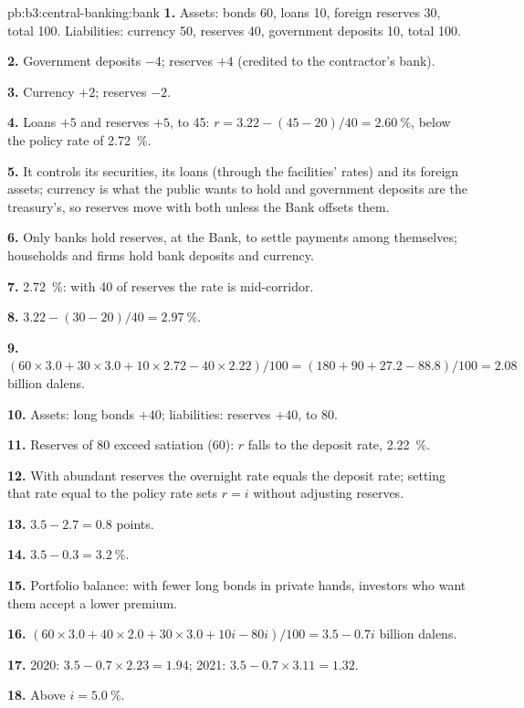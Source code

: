 \begin{solution}{pb:b3:central-banking:bank}
\textbf{1.} Assets: bonds 60, loans 10, foreign reserves 30, total 100. Liabilities:
currency 50, reserves 40, government deposits 10, total 100. %

\textbf{2.} Government deposits $-4$; reserves $+4$ (credited to the contractor's bank).

\textbf{3.} Currency $+2$; reserves $-2$.

\textbf{4.} Loans $+5$ and reserves $+5$, to 45: $r = 3.22 - (45 - 20)/40 = 2.60~\%$, below the
policy rate of 2.72~\%.

\textbf{5.} It controls its securities, its loans (through the facilities' rates) and
its foreign assets; currency is what the public wants to hold and government
deposits are the treasury's, so reserves move with both unless the Bank offsets
them.

\textbf{6.} Only banks hold reserves, at the Bank, to settle payments among
themselves; households and firms hold bank deposits and currency.

\textbf{7.} 2.72~\%: with 40 of reserves the rate is mid-corridor.

\textbf{8.} $3.22 - (30 - 20)/40 = 2.97~\%$.

\textbf{9.} $(60 \times 3.0 + 30 \times 3.0 + 10 \times 2.72 - 40 \times 2.22)/100 = (180 + 90 + 27.2 - 88.8)/100 = 2.08$
billion dalens.

\textbf{10.} Assets: long bonds $+40$; liabilities: reserves $+40$, to 80.

\textbf{11.} Reserves of 80 exceed satiation (60): $r$ falls to the deposit rate, 2.22~\%.

\textbf{12.} With abundant reserves the overnight rate equals the deposit rate;
setting that rate equal to the policy rate sets $r = i$ without adjusting reserves.

\textbf{13.} $3.5 - 2.7 = 0.8$ points.

\textbf{14.} $3.5 - 0.3 = 3.2~\%$.

\textbf{15.} Portfolio balance: with fewer long bonds in private hands, investors who
want them accept a lower premium.

\textbf{16.} $(60 \times 3.0 + 40 \times 2.0 + 30 \times 3.0 + 10i - 80i)/100 = 3.5 - 0.7i$ billion dalens.

\textbf{17.} 2020: $3.5 - 0.7 \times 2.23 = 1.94$; 2021: $3.5 - 0.7 \times 3.11 = 1.32$.

\textbf{18.} Above $i = 5.0~\%$.


\end{solution}
